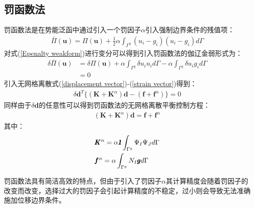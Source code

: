 \subsection{罚函数法}
罚函数法是在势能泛函中通过引入一个罚因子$\alpha$引入强制边界条件的残值项：
\begin{equation}\label{Epenalty weakform}
\begin{split}
    \bar{\Pi}(\pmb{u})=\Pi(\pmb{u})+\frac{1}{2}\alpha\int_{\Gamma^g}(u_i-g_i)(u_i-g_i)d\Gamma
\end{split}
\end{equation}
对式(\ref{Epenalty weakform})进行变分可以得到引入罚函数法的伽辽金弱形式为：
\begin{equation}
\begin{split}
    \delta\bar{\Pi}(\pmb{u})&=\delta\Pi(\pmb{u})+\alpha\int_{\Gamma^g}\delta u_iu_id\Gamma-\alpha\int_{\Gamma^g}\delta u_ig_id\Gamma\\
    &=0
\end{split}                                                 
\end{equation}
引入无网格离散式(\ref{displacement vector})-(\ref{strain vector})得到：
\begin{equation}
\begin{split}
      \delta\pmb{d}^T\{(\pmb{K}+\pmb{K}^{\alpha})\pmb{d}-(\pmb{f}+\pmb{f}^{\alpha})\}=0
\end{split}                                                 
\end{equation}
同样由于$\delta\pmb{d}$的任意性可以得到罚函数法的无网格离散平衡控制方程：
\begin{equation}
\begin{split}
    (\pmb{K}+\pmb{K}^{\alpha})\pmb{d}=\pmb{f}+\pmb{f}^{\alpha}
\end{split}
\end{equation}
其中：
\begin{equation}
\begin{split}
  &\pmb{K}^{\alpha}=\alpha\pmb{\textsl{1}}\int_{\Gamma^g}\Psi_I\Psi_Jd\Gamma\\
  &\pmb{f}^{\alpha}=\alpha\int_{\Gamma^g}N_I\pmb{g}d\Gamma
\end{split}
\end{equation}\par
罚函数法具有简洁高效的特点，但由于引入了罚因子$\alpha$其计算精度会随着罚因子的改变而改变，选择过大的罚因子会引起计算精度的不稳定，过小则会导致无法准确施加位移边界条件。
